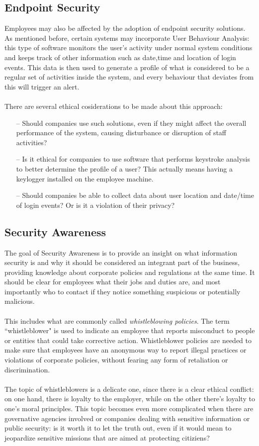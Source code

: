 	\subsection{Endpoint Security}
	Employees may also be affected by the adoption of endpoint security solutions. As mentioned before, certain systems may incorporate User Behaviour Analysis: this type of software monitors the user's activity under normal system conditions and keeps track of other information such as date,time and location of login events. This data is then used to generate a profile of what is considered to be a regular set of activities inside the system, and every behaviour that deviates from this will trigger an alert.\\\\
	There are several ethical cosiderations to be made about this approach:
	\begin{itemize}
		\item[--] Should companies use such solutions, even if they might affect the overall performance of the system, causing disturbance or disruption of staff activities?
		\item[--] Is it ethical for companies to use software that performs keystroke analysis to better determine the profile of a user? This actually means having a keylogger installed on the employee machine.
		\item[--] Should companies be able to collect data about user location and date/time of login events? Or is it a violation of their privacy?
	\end{itemize}
	

	\subsection{Security Awareness} 
	The goal of Security Awareness is to provide an insight on what information security is and why it should be considered an integrant part of the business, providing knowledge about corporate policies and regulations at the same time. It should be clear for employees what their jobs and duties are, and most importantly who to contact if they notice something suspicious or potentially malicious.\\\\
	This includes what are commonly called \textit{whistleblowing policies}. The term ``whistleblower" is used to indicate an employee that reports misconduct to people or entities that could take corrective action. Whistleblower policies are needed to make sure that employees have an anonymous way to report illegal practices or violations of corporate policies, without fearing any form of retaliation or discrimination.\\\\
	The topic of whistleblowers is a delicate one, since there is a clear ethical conflict: on one hand, there is loyalty to the employer, while on the other there's loyalty to one's moral principles. This topic becomes even more complicated when there are governative agencies involved or companies dealing with sensitive information or public security: is it worth it to let the truth out, even if it would mean to jeopardize sensitive missions that are aimed at protecting citiziens?
